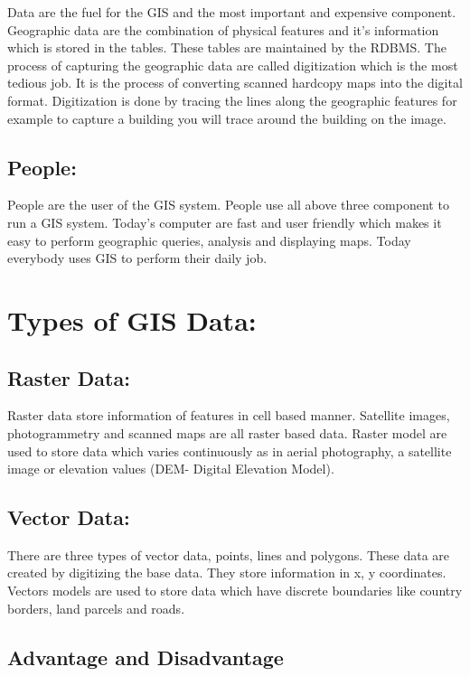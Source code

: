 \documentclass[12pt, letter]{article}
\begin{document}
Data are the fuel for the GIS and the most important and expensive component. Geographic data are the combination of physical features and it’s information which is stored in the tables. These tables are maintained by the RDBMS. The process of capturing the geographic data are called digitization which is the most tedious job. It is the process of converting scanned hardcopy maps into the digital format. Digitization is done by tracing the lines along the geographic features for example to capture a building you will trace around the building on the image.

\subsection{People:}

People are the user of the GIS system.
People use all above three component to run a GIS system. Today’s computer are fast and user friendly which makes it easy to perform geographic queries, analysis and displaying maps. Today everybody uses GIS to perform their daily job.

\section{Types of GIS Data:}

\subsection{Raster Data:}

Raster data store information of features in cell based manner. Satellite images, photogrammetry and scanned maps are all raster based data. Raster model are used to store data which varies continuously as in aerial photography, a satellite image or elevation values (DEM- Digital Elevation Model).

\subsection{Vector Data:}

There are three types of vector data, points, lines and polygons. These data are created by digitizing the base data. They store information in x, y coordinates. Vectors models are used to store data which have discrete boundaries like country borders, land parcels and roads.

\subsection{Advantage and Disadvantage}
\end{document}
